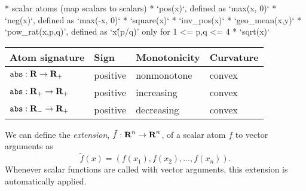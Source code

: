 \documentclass[11pt]{article}
\newcommand{\reals}{{\mbox{\bf R}}}
\begin{document}
* scalar atoms (map scalars to scalars)
  * `pos(x)`, defined as `max(x, 0)`
  * `neg(x)`, defined as `max(-x, 0)`
  * `square(x)`
  * `inv\_pos(x)`
  * `geo\_mean(x,y)`
  * `pow\_rat(x,p,q)', defined as `x\^(p/q)' only for 1 <= p,q <= 4
  * `sqrt(x)`
\begin{table}
  \centering
\begin{tabular}{|l|l|l|l|} \hline
  Atom signature & Sign & Monotonicity & Curvature \\ \hline
  ${\tt abs} : \reals \to \reals_+$ & positive & nonmonotone & convex \\ \hline
  ${\tt abs} : \reals_+ \to \reals_+$ & positive & increasing & convex \\ \hline
  ${\tt abs} : \reals_- \to \reals_+$ & positive & decreasing & convex \\ \hline
\end{tabular}
\end{table}


We can define the \emph{extension}, $\tilde f : \reals^n \to \reals^n$, 
of a scalar atom $f$ to vector arguments as
\[
\tilde f(x) = \left( f(x_1), f(x_2), \ldots, f(x_n) \right).
\]
Whenever scalar functions are called with vector arguments, this extension
is automatically applied.
\end{document}

